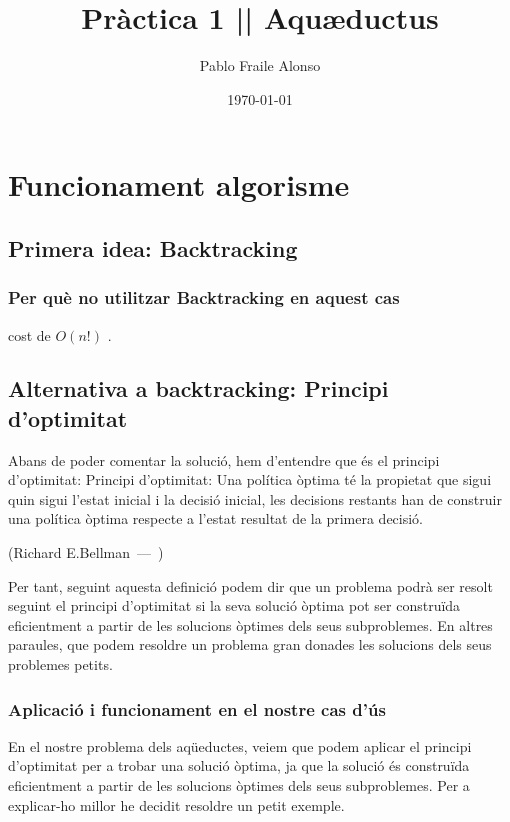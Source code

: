 \documentclass[12pt, letterpaper]{article}
\title{\textbf{Pràctica 1 || Aquæductus}}
\author{Pablo Fraile Alonso}
\date{\today}
\let\oldquote\quote
\let\endoldquote\endquote
\renewenvironment{quote}[2][]
  {\if\relax\detokenize{#1}\relax
     \def\quoteauthor{#2}%
   \else
     \def\quoteauthor{#2~---~#1}%
   \fi
   \oldquote}
  {\par\nobreak\smallskip\hfill(\quoteauthor)%
   \endoldquote\addvspace{\bigskipamount}}
\begin{document}
\maketitle
\thispagestyle{empty}
\newpage
\tableofcontents
\listoffigures
\newpage

\section{Funcionament algorisme}

\subsection{Primera idea: Backtracking}

\subsubsection{Per què no utilitzar Backtracking en aquest cas}
cost de $O(n!)$ .

\newpage
\subsection{Alternativa a backtracking: Principi d'optimitat}
Abans de poder comentar la solució, hem d'entendre que és el principi d'optimitat: 
\begin{quote}{Richard E.Bellman} Principi d'optimitat: Una política òptima té la propietat que sigui quin sigui l'estat inicial i la decisió inicial, les decisions restants han de construir una política òptima respecte a l'estat resultat de la primera decisió.
\end{quote}

Per tant, seguint aquesta definició podem dir que un problema podrà ser resolt seguint el principi d'optimitat si la seva solució òptima pot ser construïda eficientment a partir de les solucions òptimes dels seus subproblemes. En altres paraules, que podem resoldre un problema gran donades les solucions dels seus problemes petits.

\subsubsection{Aplicació i funcionament en el nostre cas d'ús}
\label{seccio:funcionament}
En el nostre problema dels aqüeductes, veiem que podem aplicar el principi d'optimitat per a trobar una solució òptima, ja que la solució és construïda eficientment a partir de les solucions òptimes dels seus subproblemes. Per a explicar-ho millor he decidit resoldre un petit exemple.
\end{document}
